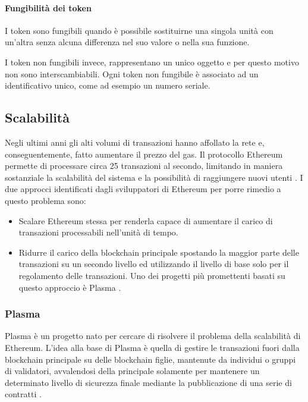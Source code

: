\paragraph{Fungibilità dei token}
I token sono fungibili quando è possibile sostituirne una singola unità con un'altra senza alcuna differenza nel suo valore o nella sua funzione.

I token non fungibili invece, rappresentano un unico oggetto e per questo motivo non sono interscambiabili. Ogni token non fungibile è associato ad un identificativo unico, come ad esempio un numero seriale.

\subsection{Scalabilità}
\label{scalabilita}
Negli ultimi anni gli alti volumi di transazioni hanno affollato la rete e, conseguentemente, fatto aumentare il prezzo del gas. Il protocollo Ethereum permette di processare circa 25 transazioni al secondo, limitando in maniera sostanziale la scalabilità del sistema e la possibilità di raggiungere nuovi utenti \cite{ethereum}.
I due approcci identificati dagli sviluppatori di Ethereum per porre rimedio a questo problema sono:
\begin{itemize}
    \item Scalare Ethereum stessa per renderla capace di aumentare il carico di transazioni processabili nell'unità di tempo.
    \item Ridurre il carico della blockchain principale spostando la maggior parte delle transazioni su un secondo livello ed utilizzando il livello di base solo per il regolamento delle transazioni. Uno dei progetti più promettenti basati su questo approccio è Plasma \cite{ethereum-scalability}.
\end{itemize}

\subsubsection{Plasma}
\label{plasma}
Plasma è un progetto nato per cercare di risolvere il problema della scalabilità di Ethereum. L'idea alla base di Plasma è quella di gestire le transazioni fuori dalla blockchain principale su delle blockchain figlie, mantenute da individui o gruppi di validatori, avvalendosi della principale solamente per mantenere un determinato livello di sicurezza finale mediante la pubblicazione di una serie di contratti \cite{plasma}.

